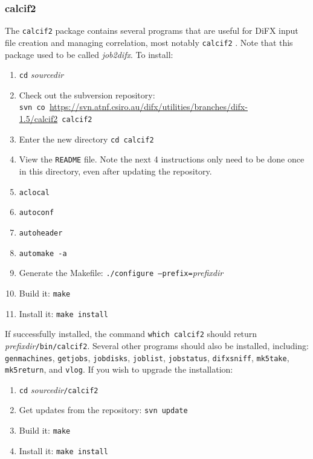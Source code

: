 
\subsubsection{calcif2} \label{package:calcif2}

The {\tt calcif2} package contains several programs that are useful for DiFX input file creation and managing correlation, most notably {\tt calcif2} .
Note that this package used to be called {\em job2difx}.
To install:
\begin{enumerate}
\item {\tt cd} {\em sourcedir}
\item Check out the subversion repository: \\
{\tt svn co }\url{https://svn.atnf.csiro.au/difx/utilities/branches/difx-1.5/calcif2}{\tt\ calcif2}
\item Enter the new directory {\tt cd calcif2}
\item View the {\tt README} file.  
Note the next 4 instructions only need to be done once in this directory, even after updating the repository.
\item {\tt aclocal}
\item {\tt autoconf}
\item {\tt autoheader}
\item {\tt automake -a}
\item Generate the Makefile: {\tt ./configure --prefix=}{\em prefixdir}
\item Build it: {\tt make}
\item Install it: {\tt make install}
\end{enumerate}

If successfully installed, the command {\tt which calcif2} should return {\em prefixdir}{\tt /bin/calcif2}.
Several other programs should also be installed, including: {\tt genmachines}, {\tt getjobs}, {\tt jobdisks}, {\tt joblist}, {\tt jobstatus}, {\tt difxsniff}, {\tt mk5take}, {\tt mk5return}, and {\tt vlog}.
If you wish to upgrade the installation:
\begin{enumerate}
\item {\tt cd} {\em sourcedir}{\tt /calcif2}
\item Get updates from the repository: {\tt svn update}
\item Build it: {\tt make}
\item Install it: {\tt make install}
\end{enumerate}







